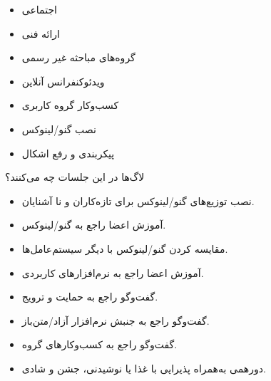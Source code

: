 \begin{itemize}
\item اجتماعی

\item ارائه فنی

\item گروه‌های مباحثه غیر رسمی

\item ویدئوکنفرانس آنلاین

\item کسب‌وکار گروه کاربری

\item نصب گنو/لینوکس

\item پیکربندی و رفع اشکال
\end{itemize}

لاگ‌ها در این جلسات چه می‌کنند؟

\begin{itemize}
\item
نصب توزیع‌های گنو/لینوکس برای تازه‌کاران و نا آشنایان.

\item
آموزش اعضا راجع به گنو/لینوکس.

\item
مقایسه کردن گنو/لینوکس با دیگر سیستم‌عامل‌ها.

\item
آموزش اعضا راجع به نرم‌افزارهای کاربردی.

\item
گفت‌وگو راجع به حمایت و ترویج.

\item
گفت‌وگو راجع به جنبش نرم‌افزار آزاد/متن‌باز.

\item
گفت‌وگو راجع به کسب‌وکارهای گروه.

\item
دورهمی به‌همراه پذیرایی با غذا یا نوشیدنی، جشن و شادی.
\end{itemize}

